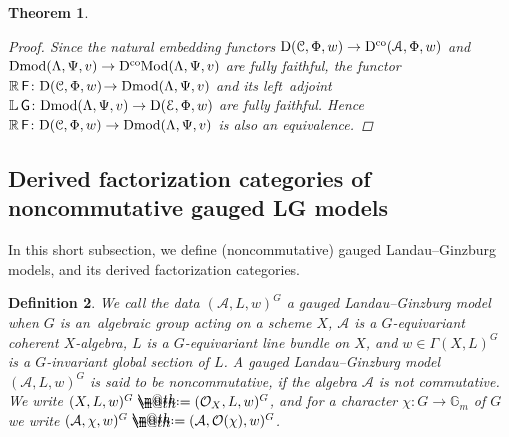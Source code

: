 \documentclass[pdftex]{sigma}%
\makeatletter
\newtheorem{dfn}{Definition}[section]
\newtheorem{thm}[dfn]{Theorem}
\newcommand*{\defeq}{\mathrel{\rlap{%
 \raisebox{0.3ex}{$\m@th\cdot$}}%
 \raisebox{-0.3ex}{$\m@th\cdot$}}%
 =}
\numberwithin{equation}{section}
\newcommand{\Dmod}{\operatorname{Dmod}}
\newcommand{\DcoMod}{\operatorname{D^{co}\hspace{-0.1mm}Mod}}
\newcommand{\Dco}{\operatorname{D^{co}}}
\newcommand{\D}{\operatorname{D}}
\newcommand{\cA}{\mathcal{A}}
\newcommand{\cO}{\mathcal{O}}
\newcommand{\bG}{\mathbb{G}}
\newcommand{\bL}{\mathbb{L}}
\newcommand{\bR}{\mathbb{R}}
\newcommand{\scrA}{\EuScript{A}}
\newcommand{\scrC}{\EuScript{C}}
\newcommand{\scrE}{\EuScript{E}}
\newcommand{\F}{\operatorname{\sf{F}}}
\newcommand{\G}{\operatorname{\sf{G}}}
\makeatother
\begin{document}
\begin{thm}
\begin{proof}
Since the natural embedding functors $\D(\scrC,\Phi,w)\to \Dco(\scrA,\Phi,w)$ and $\Dmod(\Lambda,\Psi,v)\to \DcoMod(\Lambda,\Psi,v)$ are fully faithful, the functor $\bR \F\colon\!\D(\scrC,\Phi,w)\!\to \Dmod(\Lambda,\Psi,v)$ and its left~adjo\-int $\bL \G\colon \! \Dmod(\Lambda,\Psi,v)\to \D(\scrE,\Phi,w)$ are fully faithful. Hence $\bR \F\colon\!\D(\scrC,\Phi,w)\to
\Dmod(\Lambda,\Psi,v)$ is also an equivalence.
\end{proof}
\end{thm}

\subsection{Derived factorization categories of noncommutative gauged LG models}

In this short subsection, we define (noncommutative) gauged Landau--Ginzburg models, and its derived factorization categories.

\begin{dfn}
We call the data $(\cA,L,w)^G$ a {\it gauged Landau--Ginzburg model} when $G$ is an~alge\-braic group acting on a scheme $X$, $\cA$ is a $G$-equivariant coherent $X$-algebra, $L$ is a $G$-equivariant line bundle on $X$, and $w\in \Gamma(X,L)^G$ is a $G$-invariant global section of $L$. A gauged Landau--Ginzburg model $(\cA,L,w)^G$ is said to be {\it noncommutative}, if the algebra $\cA$ is not commutative. We write $(X,L,w)^G\defeq(\cO_X,L,w)^G$, and for a character $\chi\colon G\to \bG_m$ of $G$ we write $(\cA,\chi,w)^G\defeq(\cA,\cO(\chi),w)^G$.
\end{dfn}
\end{document}
